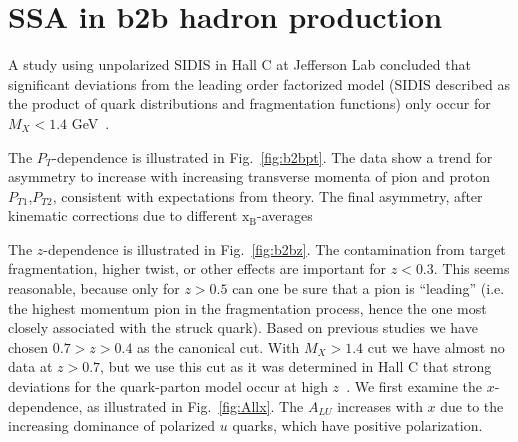 \documentclass[11pt,a4paper]{article}
\newcommand{\xbj}{\mathrm{x_{B}}}
\begin{document}
\section{SSA in b2b hadron production}


A study using unpolarized SIDIS in Hall C at Jefferson Lab
concluded that significant deviations from the leading order
factorized model (SIDIS described as the product of quark
distributions and fragmentation functions) only occur for $M_X<1.4$
GeV~\cite{Navasardyan:2006gv}. 

The $P_T$-dependence is illustrated in Fig.~\ref{fig:b2bpt}. The
data show a trend for asymmetry to increase with increasing transverse momenta of pion and proton $P_{T1}$,$P_{T2}$,
consistent with expectations from theory. 
The final asymmetry, after kinematic corrections due to different $\xbj$-averages 

The $z$-dependence is illustrated in Fig.~\ref{fig:b2bz}. 
The contamination from target
fragmentation, higher twist, or other effects are important
for $z<0.3$. This seems reasonable, because only for $z>0.5$ can 
one be sure that a pion is ``leading'' (i.e. the highest
momentum pion in the fragmentation process, hence the one
most closely associated with the struck quark).
Based on previous studies we have chosen $0.7>z>0.4$ as the canonical cut. With $M_X>1.4$ cut we have almost
no data at $z>0.7$, but we use this cut as it was determined in Hall C that
strong deviations for the quark-parton model occur at 
high $z$~\cite{Navasardyan:2006gv}.
%
We first examine the $x$-dependence, as illustrated in Fig.~\ref{fig:Allx}.
The  $A_{LU}$
increases with $x$ due to the increasing dominance of polarized $u$ quarks,
which have positive polarization.
\end{document}
